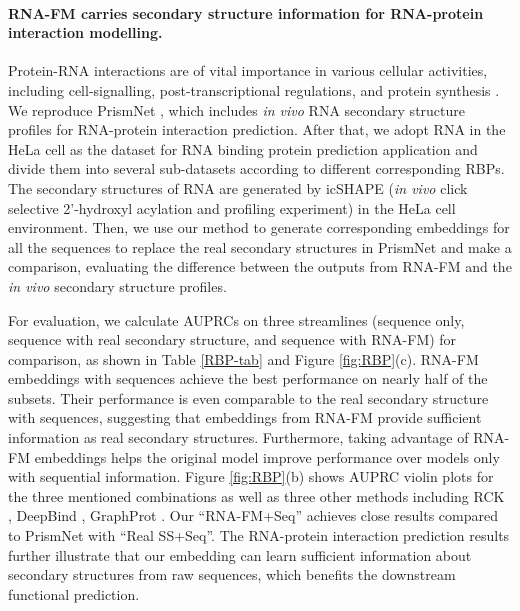 \paragraph{RNA-FM carries secondary structure information for RNA-protein interaction modelling.} Protein-RNA interactions are of vital importance in various cellular activities, including cell-signalling, post-transcriptional regulations, and protein synthesis \citep{wei2021protein}. We reproduce PrismNet \cite{sun2021predicting}, which includes \emph{in vivo} RNA secondary structure profiles for RNA-protein interaction prediction.  After that, we adopt RNA in the HeLa cell as the dataset for RNA binding protein prediction application and divide them into several sub-datasets according to different corresponding RBPs. The secondary structures of RNA are generated by icSHAPE (\emph{in vivo} click selective 2'-hydroxyl acylation and profiling experiment) \citep{spitale2015structural} in the HeLa cell environment. Then, we use our method to generate corresponding embeddings for all the sequences to replace the real secondary structures in PrismNet and make a comparison, evaluating the difference between the outputs from RNA-FM and the \emph{in vivo} secondary structure profiles.

For evaluation, we calculate AUPRCs on three streamlines (sequence only, sequence with real secondary structure, and sequence with RNA-FM) for comparison, as shown in Table \ref{RBP-tab} and Figure \ref{fig:RBP}(c). RNA-FM embeddings with sequences achieve the best performance on nearly half of the subsets. Their performance is even comparable to the real secondary structure with sequences, suggesting that embeddings from RNA-FM provide sufficient information as real secondary structures. Furthermore, taking advantage of RNA-FM embeddings helps the original model improve performance over models only with sequential information. Figure \ref{fig:RBP}(b) shows AUPRC violin plots for the three mentioned combinations as well as three other methods including RCK \citep{orenstein2016rck}, DeepBind \citep{alipanahi2015predicting}, GraphProt \citep{maticzka2014graphprot}. Our ``RNA-FM+Seq'' achieves close results compared to PrismNet with ``Real SS+Seq''. The RNA-protein interaction prediction results further illustrate that our embedding can learn sufficient information about secondary structures from raw sequences, which benefits the downstream functional prediction.




